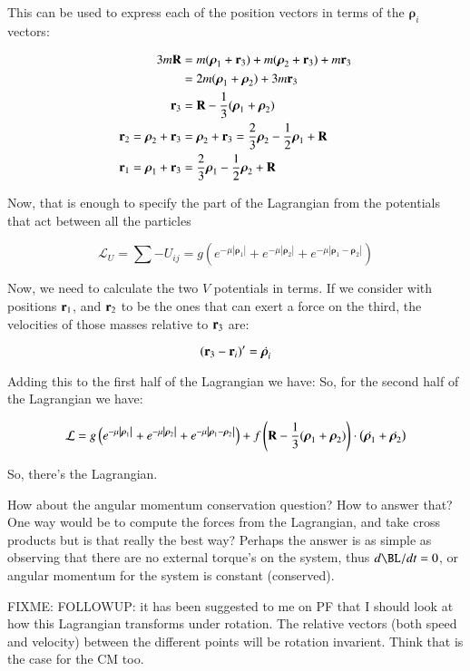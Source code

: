 \documentclass{article}      %
\newcommand{\Brho}[0]{\boldsymbol{\rho}}
\newcommand{\LL}[0]{\mathcal{L}}
\newcommand{\Abs}[1]{\left\lvert{#1}\right\rvert}
\begin{document}
This can be used to express each of the position vectors in terms of the $\Brho_i$ vectors:

\begin{align*}
3 m \BR &= m (\Brho_1 + \Br_3) + m(\Brho_2 + \Br_3) + m \Br_3 \\
        &= 2 m (\Brho_1 + \Brho_2) + 3 m \Br_3 \\
  \Br_3 &= \BR - \inv{3}(\Brho_1 + \Brho_2) \\
\Br_2 = \Brho_2 + \Br_3 &= \Brho_2 + \Br_3 = \frac{2}{3} \Brho_2 - \inv{2} \Brho_1 + \BR \\
\Br_1 = \Brho_1 + \Br_3 &= \frac{2}{3} \Brho_1 - \inv{2} \Brho_2 + \BR \\
\end{align*}

Now, that is enough to specify the part of the Lagrangian from the potentials that act between all the particles

\begin{equation*}
\LL_U = \sum -U_{ij} = g \left( e^{-\mu \Abs{\Brho_1}} + e^{-\mu \Abs{\Brho_2}} + e^{-\mu \Abs{ \Brho_1 - \Brho_2 }} \right)
\end{equation*}

Now, we need to calculate the two $V$ potentials in terms.  If we consider with positions $\mathbf{r}_1$, and $\mathbf{r}_2$ to be the ones
that can exert a force on the third, the velocities of those masses relative to $\mathbf{r}_3$ are:

\begin{equation*}
(\Br_3 - \Br_i)' = \dot{\Brho_i}
\end{equation*}

Adding this to the first half of the Lagrangian we have:
So, for the second half of the Lagrangian we have:

\begin{equation*}
\LL =
g \left( e^{-\mu \Abs{\Brho_1}} + e^{-\mu \Abs{\Brho_2}} + e^{-\mu \Abs{ \Brho_1 - \Brho_2 }} \right)
+ f \left(\BR - \inv{3}(\Brho_1 + \Brho_2) \right) \cdot \left( \dot{\Brho_1} + \dot{\Brho_2} \right)
\end{equation*}

So, there's the Lagrangian.

How about the angular momentum conservation question?  How to answer that?  One way would be to compute the forces from the Lagrangian, and take cross products but is that really the best way?  Perhaps the answer is as simple as observing that there are no external torque's on the system, thus $d\BL/dt = 0$, or angular momentum for the system is constant (conserved).

FIXME: FOLLOWUP: it has been suggested to me on PF that I should look at how this Lagrangian transforms under rotation.  The relative vectors (both speed and velocity) between the different points will be rotation invarient.  Think that is the case for the CM too.
\end{document}
